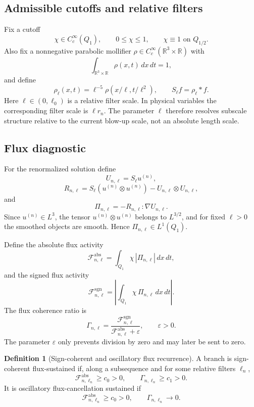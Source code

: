 \documentclass[11pt]{article}
\numberwithin{equation}{section}
\theoremstyle{plain}
\theoremstyle{definition}
\newtheorem{definition}[theorem]{Definition}
\theoremstyle{remark}
\newcommand{\R}{\mathbb R}
\newcommand{\Flux}{\mathcal F}
\newcommand{\absop}{\mathrm{abs}}
\newcommand{\sgn}{\mathrm{sgn}}
\begin{document}
\subsection{Admissible cutoffs and relative filters}

Fix a cutoff
\[
    \chi\in C_c^\infty(Q_1),
    \qquad
    0\le\chi\le1,
    \qquad
    \chi\equiv1 \text{ on } Q_{1/2}.
\]
Also fix a nonnegative parabolic mollifier \(\rho\in C_c^\infty(\R^3\times\R)\) with
\[
    \int_{\R^3\times\R}\rho(x,t)\,dx\,dt=1,
\]
and define
\[
    \rho_\ell(x,t)=\ell^{-5}\rho(x/\ell,t/\ell^2),
    \qquad
    S_\ell f=\rho_\ell*f.
\]
Here \(\ell\in(0,\ell_0)\) is a relative filter scale.  In physical variables the corresponding filter scale is \(\ell r_n\).  The parameter \(\ell\) therefore resolves subscale structure relative to the current blow-up scale, not an absolute length scale.

\subsection{Flux diagnostic}

For the renormalized solution define
\[
    U_{n,\ell}=S_\ell u^{(n)},
\]
\[
    R_{n,\ell}
    =
    S_\ell(u^{(n)}\otimes u^{(n)})
    -U_{n,\ell}\otimes U_{n,\ell},
\]
and
\[
    \Pi_{n,\ell}
    =
    -R_{n,\ell}:\nabla U_{n,\ell}.
\]
Since \(u^{(n)}\in L^3\), the tensor \(u^{(n)}\otimes u^{(n)}\) belongs to \(L^{3/2}\), and for fixed \(\ell>0\) the smoothed objects are smooth.  Hence \(\Pi_{n,\ell}\in L^1(Q_1)\).

Define the absolute flux activity
\begin{equation}
    \Flux^{\absop}_{n,\ell}
    =
    \int_{Q_1}\chi\,|\Pi_{n,\ell}|\,dx\,dt,
\end{equation}
and the signed flux activity
\begin{equation}
    \Flux^{\sgn}_{n,\ell}
    =
    \left|
    \int_{Q_1}\chi\,\Pi_{n,\ell}\,dx\,dt
    \right|.
\end{equation}
The flux coherence ratio is
\begin{equation}
    \Gamma_{n,\ell}
    =
    \frac{\Flux^{\sgn}_{n,\ell}}
    {\Flux^{\absop}_{n,\ell}+\varepsilon},
    \qquad \varepsilon>0.
\end{equation}
The parameter \(\varepsilon\) only prevents division by zero and may later be sent to zero.

\begin{definition}[Sign-coherent and oscillatory flux recurrence]
A branch is sign-coherent flux-sustained if, along a subsequence and for some relative filters \(\ell_n\),
\[
    \Flux^{\absop}_{n,\ell_n}\ge c_0>0,
    \qquad
    \Gamma_{n,\ell_n}\ge c_1>0.
\]
It is oscillatory flux-cancellation sustained if
\[
    \Flux^{\absop}_{n,\ell_n}\ge c_0>0,
    \qquad
    \Gamma_{n,\ell_n}\to0.
\]
\end{definition}
\end{document}
